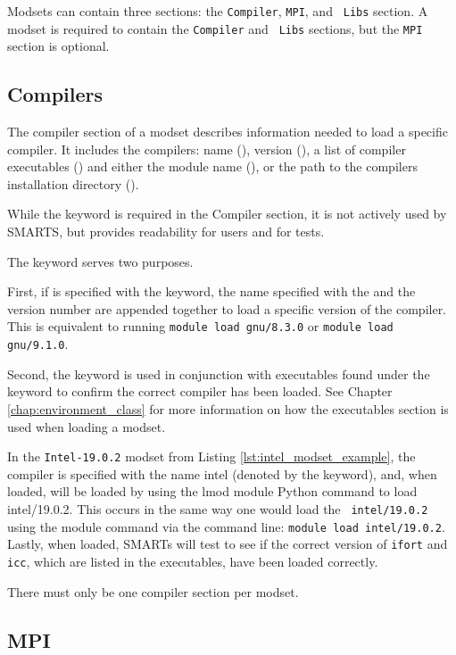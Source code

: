 Modsets can contain three sections: the {\tt Compiler}, {\tt MPI}, and {\tt
Libs} section.  A modset is required to contain the {\tt Compiler} and {\tt
Libs} sections, but the {\tt MPI} section is optional.

\subsection{Compilers}
\label{subsec:modset_compilers}

The compiler section of a modset describes information needed to load a
specific compiler. It includes the compilers: name (\name), version (\version),
a list of compiler executables (\executables) and either the module name
(\module), or the path to the compilers installation directory (\pathname).

While the \name keyword is required in the Compiler section, it is not actively 
used by SMARTS, but provides readability for users and for tests.

The \version keyword serves two purposes. 

First, if \version is specified with the \module keyword, the name specified
with the \module and the version number are appended together to load a
specific version of the compiler. This is equivalent to running {\tt module
load gnu/8.3.0} or {\tt module load gnu/9.1.0}.

Second, the \version keyword is used in conjunction with executables found
under the \executables keyword to confirm the correct compiler has been loaded.
See Chapter \ref{chap:environment_class} for more information on how the
executables section is used when loading a modset.

In the {\tt Intel-19.0.2} modset from Listing \ref{lst:intel_modset_example},
the compiler is specified with the name intel (denoted by the \module keyword),
and, when loaded, will be loaded by using the lmod module Python command to
load intel/19.0.2. This occurs in the same way one would load the {\tt
intel/19.0.2} using the module command via the command line: {\tt module load
intel/19.0.2}. Lastly, when loaded, SMARTs will test to see if the correct
version of {\tt ifort} and {\tt icc}, which are listed in the executables, have
been loaded correctly.

There must only be one compiler section per modset.

\subsection{MPI}
\label{subsec:modset_mpi}

